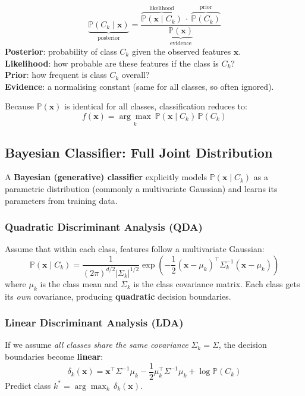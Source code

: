 \documentclass[12pt,a4paper]{article}
\newcommand{\Prob}{\mathbb{P}}
\newcommand{\x}{\mathbf{x}}
\begin{document}
\begin{tcolorbox}[defbox, title={Bayes' Theorem}]
\[
  \underbrace{\Prob(C_k \mid \x)}_{\text{posterior}}
  = \frac{\overbrace{\Prob(\x \mid C_k)}^{\text{likelihood}}\ \cdot\ \overbrace{\Prob(C_k)}^{\text{prior}}}{\underbrace{\Prob(\x)}_{\text{evidence}}}
\]
\textbf{Posterior}: probability of class $C_k$ given the observed features $\x$.\\
\textbf{Likelihood}: how probable are these features if the class is $C_k$?\\
\textbf{Prior}: how frequent is class $C_k$ overall?\\
\textbf{Evidence}: a normalising constant (same for all classes, so often ignored).
\end{tcolorbox}

Because $\Prob(\x)$ is identical for all classes, classification reduces to:
\[
  f(\x) = \underset{k}{\arg\max}\ \Prob(\x \mid C_k)\,\Prob(C_k)
\]

\subsection{Bayesian Classifier: Full Joint Distribution}

A \textbf{Bayesian (generative) classifier} explicitly models $\Prob(\x \mid C_k)$ as a parametric distribution (commonly a multivariate Gaussian) and learns its parameters from training data.

\subsubsection{Quadratic Discriminant Analysis (QDA)}

Assume that within each class, features follow a multivariate Gaussian:
\[
  \Prob(\x \mid C_k) = \frac{1}{(2\pi)^{d/2}|\Sigma_k|^{1/2}} \exp\!\left(-\frac{1}{2}(\x - \mu_k)^\top \Sigma_k^{-1}(\x - \mu_k)\right)
\]
where $\mu_k$ is the class mean and $\Sigma_k$ is the class covariance matrix. Each class gets its \emph{own} covariance, producing \textbf{quadratic} decision boundaries.

\subsubsection{Linear Discriminant Analysis (LDA)}

If we assume \emph{all classes share the same covariance} $\Sigma_k = \Sigma$, the decision boundaries become \textbf{linear}:
\[
  \delta_k(\x) = \x^\top \Sigma^{-1}\mu_k - \frac{1}{2}\mu_k^\top\Sigma^{-1}\mu_k + \log\Prob(C_k)
\]
Predict class $k^* = \arg\max_k\, \delta_k(\x)$.
\end{document}
